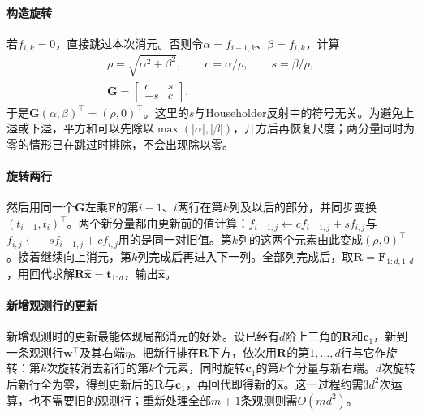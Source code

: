 \paragraph{构造旋转}
若$f_{i,k}=0$，直接跳过本次消元。否则令$\alpha=f_{i-1,k}$、$\beta=f_{i,k}$，计算
\begin{equation}
 \begin{gathered}
 \rho=\sqrt{\alpha^2+\beta^2},\qquad c=\alpha/\rho,\qquad s=\beta/\rho,\\
 \bm G=\begin{bmatrix}c&s\\-s&c\end{bmatrix},
 \end{gathered}
 \label{eq:ls-givens}
\end{equation}
于是$\bm G(\alpha,\beta)^\top=(\rho,0)^\top$。这里的$s$与Householder反射中的符号无关。为避免上溢或下溢，平方和可以先除以$\max(\lvert\alpha\rvert,\lvert\beta\rvert)$，开方后再恢复尺度；两分量同时为零的情形已在跳过时排除，不会出现除以零。

\paragraph{旋转两行}
然后用同一个$\bm G$左乘$\bm F$的第$i-1$、$i$两行在第$k$列及以后的部分，并同步变换$(t_{i-1},t_i)^\top$。两个新分量都由更新前的值计算：$f_{i-1,j}\leftarrow cf_{i-1,j}+sf_{i,j}$与$f_{i,j}\leftarrow-sf_{i-1,j}+cf_{i,j}$用的是同一对旧值。第$k$列的这两个元素由此变成$(\rho,0)^\top$。接着继续向上消元，第$k$列完成后再进入下一列。全部列完成后，取$\bm R=\bm F_{1:d,1:d}$，用回代求解$\bm R\hat{\bm x}=\bm t_{1:d}$，输出$\hat{\bm x}$。

\paragraph{新增观测行的更新}
新增观测时的更新最能体现局部消元的好处。设已经有$d$阶上三角的$\bm R$和$\bm c_1$，新到一条观测行$\bm w^\top$及其右端$\eta$。把新行排在$\bm R$下方，依次用$\bm R$的第$1,\ldots,d$行与它作旋转：第$k$次旋转消去新行的第$k$个元素，同时旋转$\bm c_1$的第$k$个分量与新右端。$d$次旋转后新行全为零，得到更新后的$\bm R$与$\bm c_1$，再回代即得新的$\hat{\bm x}$。这一过程约需$3d^2$次运算，也不需要旧的观测行；重新处理全部$m+1$条观测则需$O(md^2)$。

